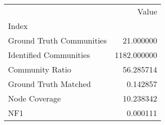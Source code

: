 \begin{tabular}{lr}
\toprule
{} &        Value \\
Index                    &              \\
\midrule
Ground Truth Communities &    21.000000 \\
Identified Communities   &  1182.000000 \\
Community Ratio          &    56.285714 \\
Ground Truth Matched     &     0.142857 \\
Node Coverage            &    10.238342 \\
NF1                      &     0.000111 \\
\bottomrule
\end{tabular}

